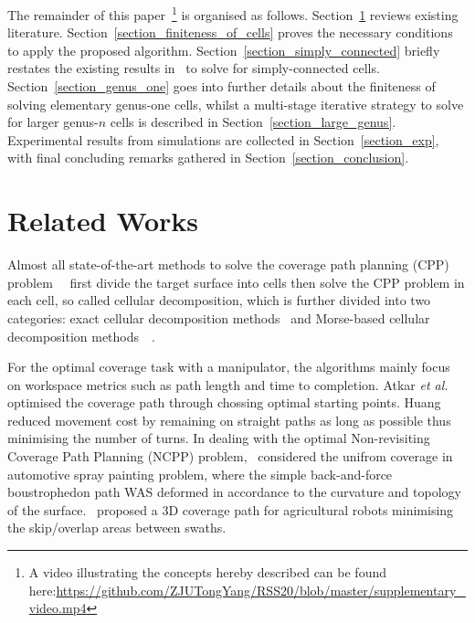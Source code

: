 \documentclass[conference]{IEEEtran}
\begin{document}
The remainder of this paper~\footnote{A video illustrating the concepts hereby described can be found 
here:\url{https://github.com/ZJUTongYang/RSS20/blob/master/supplementary\_video.mp4}} is organised as follows. 
Section~\ref{section_related_works} reviews existing literature. 
Section~\ref{section_finiteness_of_cells} proves the necessary conditions to apply the proposed algorithm. 
Section~\ref{section_simply_connected} briefly restates the existing results in~\cite{Yang2020Cellular_arxiv} to solve for 
simply-connected cells. Section~\ref{section_genus_one} goes into further details about the finiteness of solving elementary genus-one cells, whilst 
a multi-stage iterative strategy to solve for larger genus-$n$ cells is described in Section~\ref{section_large_genus}. 
Experimental results from simulations are collected in Section~\ref{section_exp}, with final concluding remarks gathered in 
Section~\ref{section_conclusion}.

\section{Related Works}\label{section_related_works}
Almost all state-of-the-art methods to solve the coverage path planning (CPP) problem~\cite{choset2001coverage}~\cite{galceran2013a} 
first divide the target surface into cells then solve the CPP problem in each cell, so called cellular decomposition, which is further divided 
into two categories: exact cellular decomposition methods~\cite{lumelsky1990dynamic} and Morse-based cellular decomposition 
methods~\cite{choset2000exact}~\cite{Acar2002Morse}. 


For the optimal coverage task with a manipulator, the algorithms mainly focus on workspace metrics such as path length and time to completion. 
Atkar \textit{et al.}~\cite{Atkar2003Towards} optimised the coverage path through chossing optimal starting points. 
Huang~\cite{huang2001optimal} reduced movement cost by remaining on straight paths as long as possible thus minimising the number of turns.
In dealing with the optimal Non-revisiting Coverage Path Planning (NCPP) problem,~\cite{Atkar2009Hierarchical} considered 
the unifrom coverage in automotive spray painting problem, where the simple back-and-force boustrophedon path WAS deformed in accordance 
to the curvature and topology of the surface.~\cite{hameed2016side-to-side} proposed a 3D coverage path for agricultural robots 
minimising the skip/overlap areas between swaths. 
\end{document}

